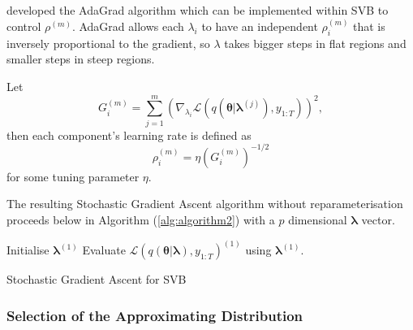 \documentclass[12pt,a4paper]{article}%
\numberwithin{equation}{section}
\begin{document}
\citet{Duchi2011} developed the AdaGrad algorithm which can be implemented within SVB to control $\rho^{(m)}$. AdaGrad allows each $\lambda_i$ to have an independent $\rho^{(m)}_i$ that is inversely proportional to the gradient, so $\lambda$ takes bigger steps in flat regions and smaller steps in steep regions. 

Let 
\begin{equation}
\label{SVB3}
G_i^{(m)} = \sum_{j = 1}^{m} \left(\nabla_{\lambda_i}\mathcal{L}(q(\boldsymbol{\theta} | \boldsymbol{\lambda}^{(j)}), y_{1:T})\right)^2,
\end{equation}
then each component's learning rate is defined as
\begin{equation}
\label{SVB4}
\rho^{(m)}_i = \eta \left(G_i^{(m)}\right)^{-1/2}
\end{equation}
for some tuning parameter $\eta$.

The resulting Stochastic Gradient Ascent algorithm without reparameterisation proceeds below in Algorithm (\ref{alg:algorithm2}) with a $p$ dimensional $\boldsymbol{\lambda}$ vector.

\vspace{2mm}

\begin{algorithm}[H]
 Initialise $\boldsymbol{\lambda}^{(1)}$\;
 Evaluate $\mathcal{L}(q(\boldsymbol{\theta} | \boldsymbol{\lambda}), y_{1:T})^{(1)}$ using $\boldsymbol{\lambda}^{(1)}$.\;
 \caption{Stochastic Gradient Ascent for SVB}
  \label{alg:algorithm2}
\end{algorithm}

\subsubsection{Selection of the Approximating Distribution} \label{sec:selection}
\end{document}
